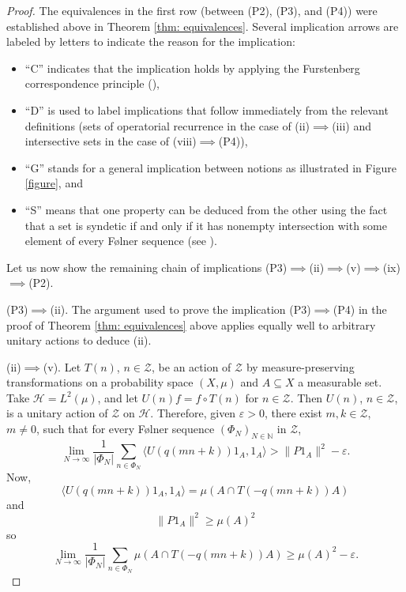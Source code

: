 \documentclass[11pt]{amsart}
\theoremstyle{theorem}
\theoremstyle{definition}
\newcommand{\N}{\mathbb{N}}
\newcommand{\mZ}{\mathcal{Z}}
\newcommand{\mH}{\mathcal{H}}
\newcommand{\eps}{\varepsilon}
\begin{document}
\begin{proof}
    The equivalences in the first row (between (P2), (P3), and (P4)) were established above in Theorem \ref{thm: equivalences}.
    Several implication arrows are labeled by letters to indicate the reason for the implication:
    \begin{itemize}
        \item ``C'' indicates that the implication holds by applying the Furstenberg correspondence principle (\cite[Theorem 4.17]{etdp}),
        \item ``D'' is used to label implications that follow immediately from the relevant definitions (sets of operatorial recurrence in the case of (ii)$\implies$(iii) and intersective sets in the case of (viii)$\implies$(P4)),
        \item ``G'' stands for a general implication between notions as illustrated in Figure \ref{figure}, and
        \item ``S'' means that one property can be deduced from the other using the fact that a set is syndetic if and only if it has nonempty intersection with some element of every F{\o}lner sequence (see \cite[Lemma 1.9]{abb}).
    \end{itemize}

    Let us now show the remaining chain of implications (P3)$\implies$(ii)$\implies$(v)$\implies$(ix)$\implies$(P2).

    (P3)$\implies$(ii).
    The argument used to prove the implication (P3)$\implies$(P4) in the proof of Theorem \ref{thm: equivalences} above applies equally well to arbitrary unitary actions to deduce (ii).

    (ii)$\implies$(v).
    Let $T(n)$, $n \in \mZ$, be an action of $\mZ$ by measure-preserving transformations on a probability space $(X, \mu)$ and $A \subseteq X$ a measurable set.
    Take $\mH = L^2(\mu)$, and let $U(n)f = f \circ T(n)$ for $n \in \mZ$.
    Then $U(n)$, $n \in \mZ$, is a unitary action of $\mZ$ on $\mH$.
    Therefore, given $\eps > 0$, there exist $m, k \in \mZ$, $m \ne 0$, such that for every F{\o}lner sequence $(\Phi_N)_{N \in \N}$ in $\mZ$,
    \begin{equation*}
        \lim_{N \to \infty} \frac{1}{|\Phi_N|} \sum_{n \in \Phi_N} \langle U(q(mn+k))1_A, 1_A \rangle > \|P1_A\|^2 - \eps.
    \end{equation*}
    Now,
    \begin{equation*}
        \langle U(q(mn+k))1_A, 1_A \rangle = \mu \left( A \cap T(-q(mn+k))A \right)
    \end{equation*}
    and
    \begin{equation*}
        \|P1_A\|^2 \ge \mu(A)^2
    \end{equation*}
    so
    \begin{equation*}
        \lim_{N \to \infty} \frac{1}{|\Phi_N|} \sum_{n \in \Phi_N} \mu(A \cap T(-q(mn+k))A) \ge \mu(A)^2 - \eps.
    \end{equation*}


\end{proof}
\end{document}
